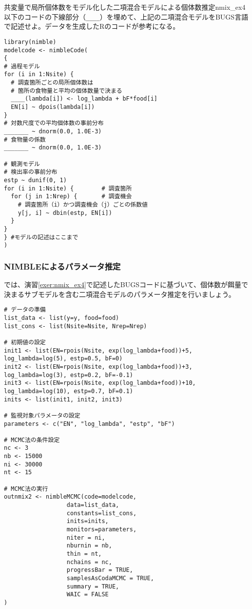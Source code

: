 \begin{exercise}{共変量で局所個体数をモデル化した二項混合モデルによる個体数推定}{nmix_ex4}
以下のコードの下線部分（\verb|____|）を埋めて、上記の二項混合モデルをBUGS言語で記述せよ。データを生成したRのコードが参考になる。
\begin{verbatim}
library(nimble)
modelcode <- nimbleCode(
{
# 過程モデル
for (i in 1:Nsite) {
  # 調査箇所ごとの局所個体数は
  # 箇所の食物量と平均の個体数量で決まる
  ____(lambda[i]) <- log_lambda + bF*food[i]
  EN[i] ~ dpois(lambda[i])
}
# 対数尺度での平均個体数の事前分布
_______ ~ dnorm(0.0, 1.0E-3)
# 食物量の係数
_______ ~ dnorm(0.0, 1.0E-3)

# 観測モデル
# 検出率の事前分布
estp ~ dunif(0, 1)
for (i in 1:Nsite) {        # 調査箇所
  for (j in 1:Nrep) {       # 調査機会
    # 調査箇所（i）かつ調査機会（j）ごとの係数値
    y[j, i] ~ dbin(estp, EN[i])
  }
}
} #モデルの記述はここまで
)
\end{verbatim}
\end{exercise}

		\subsubsection{NIMBLEによるパラメータ推定}
では、演習\ref{exer:nmix_ex4}で記述したBUGSコードに基づいて、個体数が餌量で決まるサブモデルを含む二項混合モデルのパラメータ推定を行いましょう。
\begin{verbatim}
# データの準備
list_data <- list(y=y, food=food)
list_cons <- list(Nsite=Nsite, Nrep=Nrep)

# 初期値の設定
init1 <- list(EN=rpois(Nsite, exp(log_lambda+food))+5, log_lambda=log(5), estp=0.5, bF=0)
init2 <- list(EN=rpois(Nsite, exp(log_lambda+food))+3, log_lambda=log(3), estp=0.2, bF=-0.1)
init3 <- list(EN=rpois(Nsite, exp(log_lambda+food))+10, log_lambda=log(10), estp=0.7, bF=0.1)
inits <- list(init1, init2, init3)

# 監視対象パラメータの設定
parameters <- c("EN", "log_lambda", "estp", "bF")

# MCMC法の条件設定
nc <- 3
nb <- 15000
ni <- 30000
nt <- 15

# MCMC法の実行
outnmix2 <- nimbleMCMC(code=modelcode,
                  data=list_data,
                  constants=list_cons,
                  inits=inits,
                  monitors=parameters,
                  niter = ni,
                  nburnin = nb,
                  thin = nt,
                  nchains = nc,
                  progressBar = TRUE,
                  samplesAsCodaMCMC = TRUE,
                  summary = TRUE,
                  WAIC = FALSE
)
\end{verbatim}
